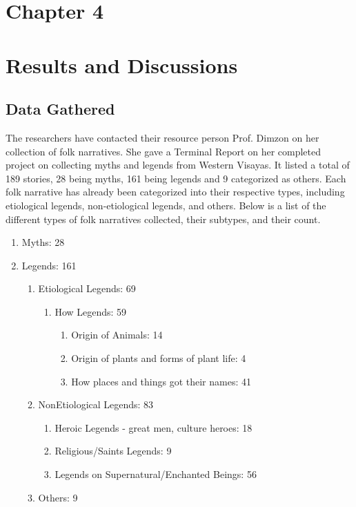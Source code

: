 \section*{Chapter 4}
\section{Results and Discussions}
\subsection{Data Gathered}

The researchers have contacted their resource person Prof. Dimzon on her collection of folk narratives. She gave a Terminal Report  on her completed project on collecting myths and legends from Western Visayas. It listed a total of 189 stories, 28 being myths, 161 being legends and 9 categorized as others. Each folk narrative has already been categorized into their respective types, including etiological legends, non-etiological legends, and others. Below is a list of the different types of folk narratives collected, their subtypes, and their count.

\begin{enumerate}[label=\Roman*.]
\item Myths: 28
    \item Legends: 161
    \begin{enumerate} [label=\Alph*.]
        \item Etiological Legends: 69
        \begin{enumerate}[label=\roman*.]
            \item How Legends: 59
            \begin{enumerate}[label=\alph*.]
                \item Origin of Animals: 14
                \item Origin of plants and forms of plant life: 4
                \item How places and things got their names: 41
            \end{enumerate}
        \end{enumerate}
        \item NonEtiological Legends: 83
            \begin{enumerate}[label=\roman*.]
                \item Heroic Legends - great men, culture heroes: 18
                \item Religious/Saints Legends: 9
                \item Legends on Supernatural/Enchanted Beings: 56
            \end{enumerate}
        \item Others: 9
    \end{enumerate}
\end{enumerate}

